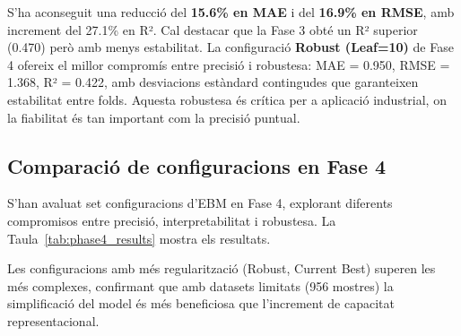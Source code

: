 S'ha aconseguit una reducció del \textbf{15.6\% en MAE} i del \textbf{16.9\% en RMSE}, amb increment del 27.1\% en R². Cal destacar que la Fase 3 obté un R² superior (0.470) però amb menys estabilitat. La configuració \textbf{Robust (Leaf=10)} de Fase 4 ofereix el millor compromís entre precisió i robustesa: MAE = 0.950, RMSE = 1.368, R² = 0.422, amb desviacions estàndard contingudes que garanteixen estabilitat entre folds. Aquesta robustesa és crítica per a aplicació industrial, on la fiabilitat és tan important com la precisió puntual.

\subsection{Comparació de configuracions en Fase 4}

S'han avaluat set configuracions d'EBM en Fase 4, explorant diferents compromisos entre precisió, interpretabilitat i robustesa. La Taula~\ref{tab:phase4_results} mostra els resultats.

\begin{table}[htbp]
\centering
\caption{Resultats de les set configuracions d'EBM en Fase 4 amb 5-fold cross-validation.}
\label{tab:phase4_results}
\scriptsize
{}
\end{table}

Les configuracions amb més regularització (Robust, Current Best) superen les més complexes, confirmant que amb datasets limitats (956 mostres) la simplificació del model és més beneficiosa que l'increment de capacitat representacional.

